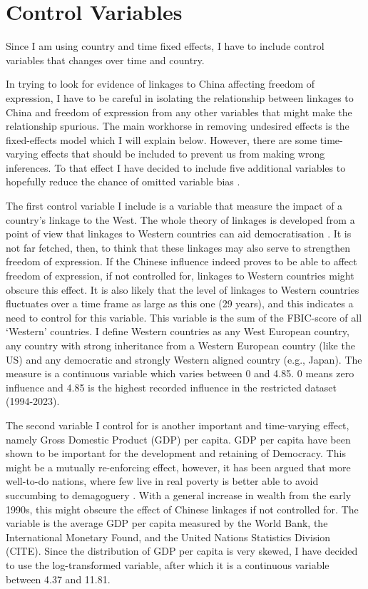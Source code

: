 \section{Control Variables}

Since I am using country and time fixed effects, I have to include control variables that changes over time and country. 

In trying to look for evidence of linkages to China affecting freedom of expression, I have to be careful in isolating the relationship between linkages to China and freedom of expression from any other variables that might make the relationship spurious. The main workhorse in removing undesired effects is the fixed-effects model which I will explain below. However, there are some time-varying effects that should be included to prevent us from making wrong inferences. To that effect I have decided to include five additional variables to hopefully reduce the chance of omitted variable bias \citep[pp. 81-85]{wooldridge_econometric_2010}.

The first control variable I include is a variable that measure the impact of a country's linkage to the West. The whole theory of linkages is developed from a point of view that linkages to Western countries can aid democratisation \citep{levitsky_linkage_2006}. It is not far fetched, then, to think that these linkages may also serve to strengthen freedom of expression. If the Chinese influence indeed proves to be able to affect freedom of expression, if not controlled for, linkages to Western countries might obscure this effect. It is also likely that the level of linkages to Western countries fluctuates over a time frame as large as this one (29 years), and this indicates a need to control for this variable. This variable is the sum of the FBIC-score of all `Western' countries. I define Western countries as any West European country, any country with strong inheritance from a Western European country (like the US) and any democratic and strongly Western aligned country (e.g., Japan). The measure is a continuous variable which varies between 0 and 4.85. 0 means zero influence and 4.85 is the highest recorded influence in the restricted dataset (1994-2023). 

The second variable I control for is another important and time-varying effect, namely Gross Domestic Product (GDP) per capita. GDP per capita have been shown to be important for the development and retaining of Democracy. This might be a mutually re-enforcing effect, however, it has been argued that more well-to-do nations, where few live in real poverty is better able to avoid succumbing to demagoguery \citep[p. 75]{lipset_social_1959}. With a general increase in wealth from the early 1990s, this might obscure the effect of Chinese linkages if not controlled for. The variable is the average GDP per capita measured by the World Bank, the International Monetary Found, and the United Nations Statistics Division (CITE). Since the distribution of GDP per capita is very skewed, I have decided to use the log-transformed variable, after which it is a continuous variable between 4.37 and 11.81. 

